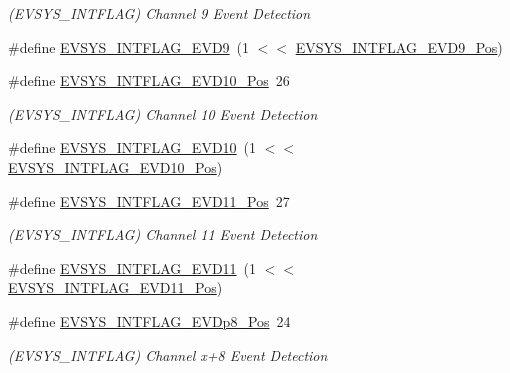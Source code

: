\begin{DoxyCompactItemize}
\begin{DoxyCompactList}\small\item\em (E\+V\+S\+Y\+S\+\_\+\+I\+N\+T\+F\+L\+AG) Channel 9 Event Detection \end{DoxyCompactList}\item 
\#define \mbox{\hyperlink{group___s_a_m_d21___e_v_s_y_s_gab9b673a320dbf20ea2c26c343848fa5c}{E\+V\+S\+Y\+S\+\_\+\+I\+N\+T\+F\+L\+A\+G\+\_\+\+E\+V\+D9}}~(1 $<$$<$ \mbox{\hyperlink{group___s_a_m_d21___e_v_s_y_s_ga839721268721622ec3547c5f0a8bb3e5}{E\+V\+S\+Y\+S\+\_\+\+I\+N\+T\+F\+L\+A\+G\+\_\+\+E\+V\+D9\+\_\+\+Pos}})
\item 
\#define \mbox{\hyperlink{group___s_a_m_d21___e_v_s_y_s_ga6dd42809a06d4469c992d2c461cb8c14}{E\+V\+S\+Y\+S\+\_\+\+I\+N\+T\+F\+L\+A\+G\+\_\+\+E\+V\+D10\+\_\+\+Pos}}~26
\begin{DoxyCompactList}\small\item\em (E\+V\+S\+Y\+S\+\_\+\+I\+N\+T\+F\+L\+AG) Channel 10 Event Detection \end{DoxyCompactList}\item 
\#define \mbox{\hyperlink{group___s_a_m_d21___e_v_s_y_s_ga77313dda9583c33759f8b5b5a9720e45}{E\+V\+S\+Y\+S\+\_\+\+I\+N\+T\+F\+L\+A\+G\+\_\+\+E\+V\+D10}}~(1 $<$$<$ \mbox{\hyperlink{group___s_a_m_d21___e_v_s_y_s_ga6dd42809a06d4469c992d2c461cb8c14}{E\+V\+S\+Y\+S\+\_\+\+I\+N\+T\+F\+L\+A\+G\+\_\+\+E\+V\+D10\+\_\+\+Pos}})
\item 
\#define \mbox{\hyperlink{group___s_a_m_d21___e_v_s_y_s_gae2501d03b71c840f1f375f748a4f2336}{E\+V\+S\+Y\+S\+\_\+\+I\+N\+T\+F\+L\+A\+G\+\_\+\+E\+V\+D11\+\_\+\+Pos}}~27
\begin{DoxyCompactList}\small\item\em (E\+V\+S\+Y\+S\+\_\+\+I\+N\+T\+F\+L\+AG) Channel 11 Event Detection \end{DoxyCompactList}\item 
\#define \mbox{\hyperlink{group___s_a_m_d21___e_v_s_y_s_ga384b4667e76be9b24d9e49d4668aecb3}{E\+V\+S\+Y\+S\+\_\+\+I\+N\+T\+F\+L\+A\+G\+\_\+\+E\+V\+D11}}~(1 $<$$<$ \mbox{\hyperlink{group___s_a_m_d21___e_v_s_y_s_gae2501d03b71c840f1f375f748a4f2336}{E\+V\+S\+Y\+S\+\_\+\+I\+N\+T\+F\+L\+A\+G\+\_\+\+E\+V\+D11\+\_\+\+Pos}})
\item 
\#define \mbox{\hyperlink{group___s_a_m_d21___e_v_s_y_s_ga636ccdba5cad0fa3b4c14a2d0f88681b}{E\+V\+S\+Y\+S\+\_\+\+I\+N\+T\+F\+L\+A\+G\+\_\+\+E\+V\+Dp8\+\_\+\+Pos}}~24
\begin{DoxyCompactList}\small\item\em (E\+V\+S\+Y\+S\+\_\+\+I\+N\+T\+F\+L\+AG) Channel x+8 Event Detection \end{DoxyCompactList}\item 
$$
\end{DoxyCompactItemize}
